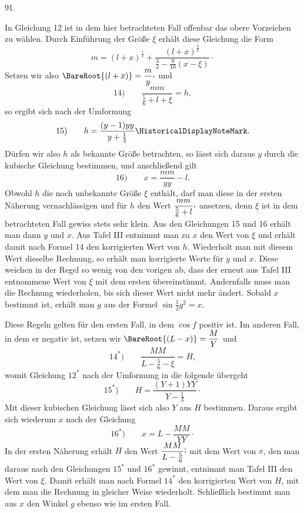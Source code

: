 \par{}\medskip
\hypertarget{native-124-article091}{}
\begin{center}91.\end{center}
In Gleichung 12 ist in dem hier betrachteten Fall offenbar das obere Vorzeichen zu wählen. Durch Einführung der Größe $\xi$ erhält diese Gleichung die Form
\[
m=(l+x)^{\frac12}+\dfrac{(l+x)^{\frac32}}{\frac34-\frac{9}{10}(x-\xi)}\mathpunct{\cdot}
\]
Setzen wir also $\BareRoot{(l+x)}=\dfrac{m}{y}\mathpunct{\raisebox{.45ex}{,}}$ und
\[
\mathrm{14)}\qquad \dfrac{mm}{\frac56+l+\xi}=h,
\]
so ergibt sich nach der Umformung
\[
\mathrm{15)}\qquad h=\dfrac{(y-1)yy}{y+\frac13}\mbox{\HistoricalDisplayNoteMark}.
\]
\noindent\HistoricalDisplayNoteText{Handschriftliche Bemerkung:]
\[
y-1=\dfrac{l+x}{\frac34-\frac{9}{10}(x-\xi)}
\]
\[
y=1+\frac{10}{9}h-\frac{110}{81}hh+\frac{2410}{729}h^3-\text{usw.}
\]
\[
yy=1+\frac{20}{9}h-\frac{40}{27}hh+\frac{2620}{729}h^3-\text{usw.}
\]
\[
\dfrac{1}{yy}=1-\frac{20}{9}h+\frac{520}{81}hh-\frac{5140}{243}h^3+\text{usw.}
\]
}Dürfen wir also $h$ als bekannte Größe betrachten, so lässt sich daraus $y$ durch die kubische Gleichung bestimmen, und anschließend gilt
\[
\mathrm{16)}\qquad x=\dfrac{mm}{yy}-l.
\]
Obwohl $h$ die noch unbekannte Größe $\xi$ enthält, darf man diese in der ersten Näherung vernachlässigen und für $h$ den Wert $\dfrac{mm}{\frac56+l}\mathpunct{\raisebox{.45ex}{,}}$ ansetzen, denn $\xi$ ist in dem betrachteten Fall gewiss stets sehr klein. Aus den Gleichungen 15 und 16 erhält man dann $y$ und $x$. Aus Tafel III entnimmt man zu $x$ den Wert von $\xi$ und erhält damit nach Formel 14 den korrigierten Wert von $h$. Wiederholt man mit diesem Wert dieselbe Rechnung, so erhält man korrigierte Werte für $y$ und $x$. Diese weichen in der Regel so wenig von den vorigen ab, dass der erneut aus Tafel III entnommene Wert von $\xi$ mit dem ersten übereinstimmt. Andernfalls muss man die Rechnung wiederholen, bis sich dieser Wert nicht mehr ändert. Sobald $x$ bestimmt ist, erhält man $g$ aus der Formel $\sin\tfrac12 g^2=x$.

Diese Regeln gelten für den ersten Fall, in dem $\cos f$ positiv ist. Im anderen Fall, in dem er negativ ist, setzen wir $\BareRoot{(L-x)}=\dfrac{M}{Y}$ und
\[
\mathrm{14}^{\ast}\mathrm{)}\qquad \dfrac{MM}{L-\frac56-\xi}=H,
\]
womit Gleichung $12^{\ast}$ nach der Umformung in die folgende übergeht
\[
\mathrm{15}^{\ast}\mathrm{)}\qquad H=\dfrac{(Y+1)YY}{Y-\frac13}\mathpunct{\cdot}
\]
Mit dieser kubischen Gleichung lässt sich also $Y$ aus $H$ bestimmen. Daraus ergibt sich wiederum $x$ nach der Gleichung
\[
\mathrm{16}^{\ast}\mathrm{)}\qquad x=L-\dfrac{MM}{YY}\mathpunct{\cdot}
\]
In der ersten Näherung erhält $H$ den Wert $\dfrac{MM}{L-\frac56}\mathpunct{\raisebox{.45ex}{;}}$ mit dem Wert von $x$, den man daraus nach den Gleichungen $15^{\ast}$ und $16^{\ast}$ gewinnt, entnimmt man Tafel III den Wert von $\xi$. Damit erhält man nach Formel $14^{\ast}$ den korrigierten Wert von $H$, mit dem man die Rechnung in gleicher Weise wiederholt. Schließlich bestimmt man aus $x$ den Winkel $g$ ebenso wie im ersten Fall.
